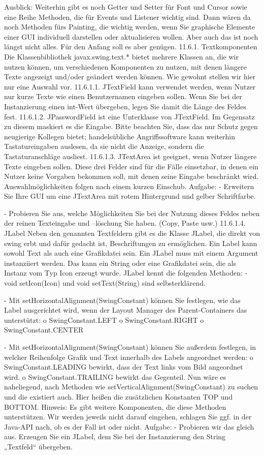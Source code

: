 Ausblick: Weiterhin gibt es noch Getter und Setter für Font und Cursor sowie eine Reihe Methoden, die für Events und Listener wichtig sind. Dann wären da noch Methoden fürs Painting, die wichtig werden, wenn Sie graphische Elemente einer GUI individuell darstellen oder aktualisieren wollen. Aber auch das ist noch längst nicht alles. Für den Anfang soll es aber genügen.
11.6.1.	Textkomponenten
Die Klassenbibliothek javax.swing.text.* bietet mehrere Klassen an, die wir nutzen können, um verschiedenen Komponenten zu nutzen, mit denen längere Texte angezeigt und/oder geändert werden können. Wie gewohnt stellen wir hier nur eine Auswahl vor.
11.6.1.1.	JTextField
kann verwendet werden, wenn Nutzer nur kurze Texte wie einen Benutzernamen eingeben sollen. Wenn Sie bei der Instanzierung einen int-Wert übergeben, legen Sie damit die Länge des Feldes fest.
11.6.1.2.	JPasswordField
ist eine Unterklasse von JTextField. Im Gegensatz zu diesem maskiert es die Eingabe. Bitte beachten Sie, dass das nur Schutz gegen neugierige Kollegen bietet; handelsübliche Angriffssoftware kann weiterhin Tastatureingaben auslesen, da sie nicht die Anzeige, sondern die Tastaturanschläge ausliest.
11.6.1.3.	JTextArea
ist geeignet, wenn Nutzer längere Texte eingeben sollen.
Diese drei Felder sind für die Fälle einsetzbar, in denen ein Nutzer keine Vorgaben bekommen soll, mit denen seine Eingabe beschränkt wird. Auswahlmöglichkeiten folgen nach einem kurzen Einschub.
Aufgabe:
-	Erweitern Sie Ihre GUI um eine JTextArea mit rotem Hintergrund und gelber Schriftfarbe.

-	Probieren Sie aus, welche Möglichkeiten Sie bei der Nutzung dieses Feldes neben der reinen Texteingabe und –löschung Sie haben. (Copy, Paste usw.)
11.6.1.4.	JLabel
Neben den genannten Textfeldern gibt es die Klasse JLabel, die direkt von swing erbt und dafür gedacht ist, Beschriftungen zu ermöglichen. Ein Label kann sowohl Text als auch eine Grafikdatei sein.
Ein JLabel muss mit einem Argument instanziiert werden. Das kann ein String oder eine Grafikdatei sein, die als Instanz vom Typ Icon erzeugt wurde.
JLabel kennt die folgenden Methoden:
-	void setIcon(Icon) und void setText(String) sind selbsterklärend.

-	Mit setHorizontalAlignment(SwingConstant) können Sie festlegen, wie das Label ausgerichtet wird, wenn der Layout Manager des Parent-Containers das unterstützt: 
o	SwingConstant.LEFT
o	SwingConstant.RIGHT
o	SwingConstant.CENTER

-	Mit setHorizontalAlignment(SwingConstant) können Sie außerdem festlegen, in welcher Reihenfolge Grafik und Text innerhalb des Labels angeordnet werden:
o	SwingConstant.LEADING bewirkt, dass der Text links vom Bild angeordnet wird.
o	SwingConstant.TRAILING bewirkt das Gegenteil.
Nun wäre es naheliegend, nach Methoden wie setVerticalAlignment(SwingConstant) zu suchen und die existiert auch. Hier heißen die zusätzlichen Konstanten TOP und BOTTOM.
Hinweis: Es gibt weitere Komponenten, die diese Methoden unterstützen. Wir werden jeweils nicht darauf eingehen, schlagen Sie ggf. in der Java-API nach, ob es der Fall ist oder nicht.
Aufgabe:
-	Probieren wir das gleich aus. Erzeugen Sie ein JLabel, dem Sie bei der Instanzierung den String „Textfeld“ übergeben.

